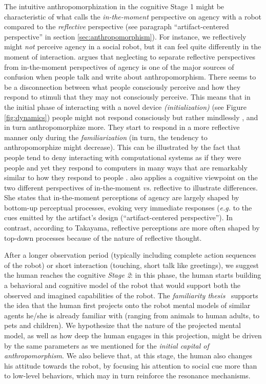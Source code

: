 \documentclass{frontiersSCNS} %
\newcommand{\eg}{\textit{e.g.}\xspace}
\newcommand{\vs}{\textit{vs.}\xspace}
\begin{document}
The intuitive anthropomorphization in the cognitive Stage 1 might be
characteristic of what \cite{takayama_perspectives_2012} calls the
\textit{in-the-moment} perspective on agency with a robot compared to the
\textit{reflective} perspective (see paragraph ``artifact-centered perspective''
in section \ref{sec:anthropomorphism}).  For instance, we reflectively might
\textit{not} perceive agency in a social robot, but it can feel quite
differently in the moment of interaction. \cite{takayama_perspectives_2012}
argues that neglecting to separate reflective perspectives from in-the-moment
perspectives of agency is one of the major sources of confusion when people talk
and write about anthropomorphism. There seems to be a disconnection between what
people consciously perceive and how they respond to stimuli that they may not
consciously perceive. This means that in the initial phase of interacting with a
novel device \textit{(initialization)} (see Figure \ref{fig:dynamics}) people
might not respond consciously but rather mindlessly \citep{nass_machines_2000},
and in turn anthropomorphize more. They start to respond in a more reflective
manner only during the \textit{familiarization} (in turn, the tendency to
anthropomorphize might decrease). This can be illustrated by the fact that
people tend to deny interacting with computational systems as if they were
people and yet they respond to computers in many ways that are remarkably
similar to how they respond to people \citep{reeves_media_1996}.
\cite{takayama_perspectives_2012} also applies a cognitive viewpoint on the two
different perspectives of in-the-moment \vs reflective to illustrate
differences. She states that in-the-moment perceptions of agency are largely
shaped by bottom-up perceptual processes, evoking very immediate responses (\eg
to the cues emitted by the artifact's design (``artifact-centered
perspective''). In contrast, according to Takayama, reflective perceptions are
more often shaped by top-down processes because of the nature of reflective
thought.

After a longer observation period (typically including complete action sequences
of the robot) or short interaction (touching, short talk like greetings), we
suggest the human reaches the cognitive \emph{Stage 2}: in this phase, the human
starts building a behavioral and cognitive model of the robot that would support
both the observed and imagined capabilities of the robot.  The \emph{familiarity
thesis}~\citep{hegel_understanding_2008} supports the idea that the human first
projects onto the robot mental models of similar agents he/she is already
familiar with (ranging from animals to human adults, to pets and children). We
hypothesize that the nature of the projected mental model, as well as how deep
the human engages in this projection, might be driven by the same parameters as
we mentioned for the \emph{initial capital of anthropomorphism}. We also believe
that, at this stage, the human also changes his attitude towards the robot, by
focusing his attention to social cue more than to low-level behaviors, which
may in turn reinforce the resonance mechanisms.
\end{document}
